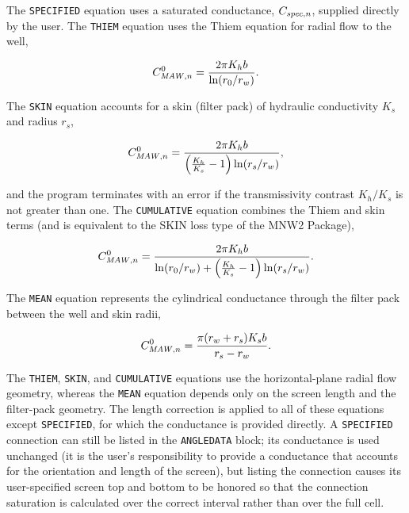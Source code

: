 The \texttt{SPECIFIED} equation uses a saturated conductance, $C_{\mathit{spec},n}$, supplied directly by the user. The \texttt{THIEM} equation uses the Thiem equation for radial flow to the well,

\begin{equation}
	\label{eqn:mawnv-thiem}
	C^0_{\mathit{MAW},n} = \frac{2 \pi K_h b}{\ln(r_0 / r_w)} .
\end{equation}

\noindent The \texttt{SKIN} equation accounts for a skin (filter pack) of hydraulic conductivity $K_s$ and radius $r_s$,

\begin{equation}
	\label{eqn:mawnv-skin}
	C^0_{\mathit{MAW},n} = \frac{2 \pi K_h b}{\left( \frac{K_h}{K_s} - 1 \right) \ln(r_s / r_w)} ,
\end{equation}

\noindent and the program terminates with an error if the transmissivity contrast $K_h / K_s$ is not greater than one. The \texttt{CUMULATIVE} equation combines the Thiem and skin terms (and is equivalent to the SKIN loss type of the MNW2 Package),

\begin{equation}
	\label{eqn:mawnv-cumulative}
	C^0_{\mathit{MAW},n} = \frac{2 \pi K_h b}{\ln(r_0 / r_w) + \left( \frac{K_h}{K_s} - 1 \right) \ln(r_s / r_w)} .
\end{equation}

\noindent The \texttt{MEAN} equation represents the cylindrical conductance through the filter pack between the well and skin radii,

\begin{equation}
	\label{eqn:mawnv-meaneq}
	C^0_{\mathit{MAW},n} = \frac{\pi (r_w + r_s) K_s b}{r_s - r_w} .
\end{equation}

\noindent The \texttt{THIEM}, \texttt{SKIN}, and \texttt{CUMULATIVE} equations use the horizontal-plane radial flow geometry, whereas the \texttt{MEAN} equation depends only on the screen length and the filter-pack geometry. The length correction is applied to all of these equations except \texttt{SPECIFIED}, for which the conductance is provided directly. A \texttt{SPECIFIED} connection can still be listed in the \texttt{ANGLEDATA} block; its conductance is used unchanged (it is the user's responsibility to provide a conductance that accounts for the orientation and length of the screen), but listing the connection causes its user-specified screen top and bottom to be honored so that the connection saturation is calculated over the correct interval rather than over the full cell.

